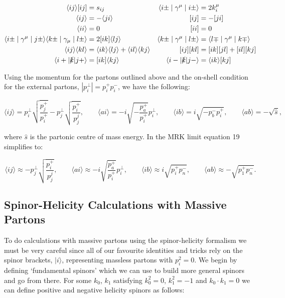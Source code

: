 	\begin{align}
		\langle ij\rangle[ij] &= s_{ij} & \langle i\pm\mid\gamma^\mu\mid i\pm\rangle &= 2k_i^\mu \\
		\langle ij\rangle &= -\langle ji\rangle & [ij] &= -[ji] \\
		\langle ii\rangle &= 0 & [ii] &= 0 \\
		\langle i\pm\mid\gamma^\mu\mid j\pm\rangle\langle k\pm\mid\gamma_\mu\mid l\pm\rangle &=
		2[ik]\langle l j\rangle & \langle k\pm\mid\gamma^\mu\mid l\pm\rangle &=
		\langle l\mp\mid\gamma^\mu\mid k\mp\rangle \\
		\langle i j\rangle\langle k l\rangle &=
		\langle i k\rangle\langle l j\rangle + \langle i l\rangle\langle k j\rangle & [ij][kl] &=
		[ik][jl]+[il][kj] \\
		\langle i+|\slashed k|j+\rangle &= [ik]\langle kj\rangle & \langle i-|\slashed k|j-\rangle &= \langle ik\rangle [kj]
	\end{align}

	Using the momentum for the partons outlined above and the on-shell condition for the external partons, $|p_i^\perp|=p_i^+p_i^-$, we have the following:

	\begin{equation}
	\langle ij\rangle = p_i^\perp\sqrt{\frac{p_j^+}{p_i^+}} - p_j^\perp\sqrt{\frac{p_i^+}{p_j^j}},
	\qquad
	\langle ai\rangle = -i\sqrt{-\frac{p_a^+}{p_i^+}}p_i^\perp,
	\qquad
	\langle ib\rangle = i\sqrt{-p_b^-p_i^+},
	\qquad
	\langle ab\rangle = -\sqrt{\hat{s}},
	\end{equation}

	where $\hat{s}$ is the partonic centre of mass energy.  In the MRK limit equation 19 simplifies to:

	\begin{equation}
	\langle ij\rangle \approx - p_j^\perp\sqrt{\frac{p_i^+}{p_j^j}},
	\qquad
	\langle ai\rangle \approx -i\sqrt{\frac{p_a^+}{p_i^+}}p_i^\perp,
	\qquad
	\langle ib\rangle \approx i\sqrt{p_i^+p_n^-},
	\qquad
	\langle ab\rangle \approx -\sqrt{p_1^+p_n^-}.
	\end{equation}

	\subsection{Spinor-Helicity Calculations with Massive Partons}
	\label{sub:SMMassive}

	To do calculations with massive partons using the spinor-helicity formalism we must be very careful since all of our favourite
	identities and tricks rely on the spinor brackets, $|i\rangle$, representing massless partons with $p_i^2=0$.
	We begin by defining `fundamental spinors' \cite{Thesis} which we can use to build more general spinors and go from there.
	For some $k_0$, $k_1$ satisfying $k_0^2=0$, $k_1^2=-1$ and $k_0\cdot k_1=0$ we can define positive and negative helicity spinors as follows:

